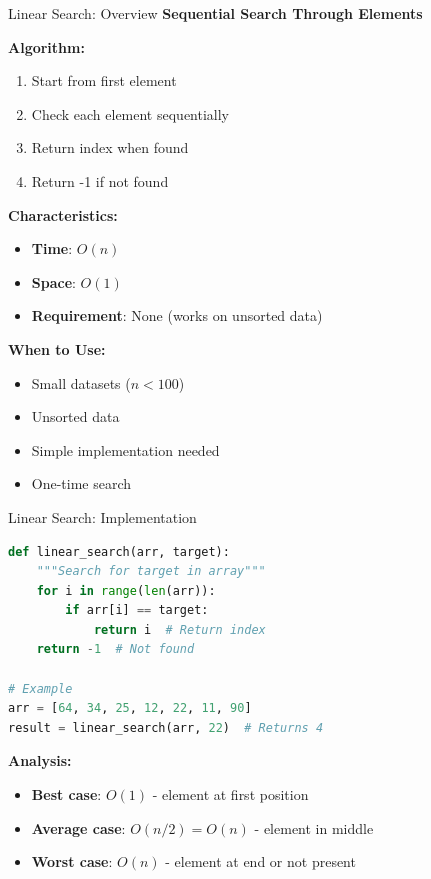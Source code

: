 \documentclass[aspectratio=169]{beamer}
\begin{document}
\begin{frame}{Linear Search: Overview}
  \textbf{Sequential Search Through Elements}

  \vspace{0.3cm}
  \textbf{Algorithm:}
  \begin{enumerate}
    \item Start from first element
    \item Check each element sequentially
    \item Return index when found
    \item Return -1 if not found
  \end{enumerate}

  \vspace{0.3cm}
  \textbf{Characteristics:}
  \begin{itemize}
    \item \textbf{Time}: $O(n)$
    \item \textbf{Space}: $O(1)$
    \item \textbf{Requirement}: None (works on unsorted data)
  \end{itemize}

  \vspace{0.3cm}
  \textbf{When to Use:}
  \begin{itemize}
    \item Small datasets ($n < 100$)
    \item Unsorted data
    \item Simple implementation needed
    \item One-time search
  \end{itemize}
\end{frame}

\begin{frame}[fragile]{Linear Search: Implementation}
\begin{lstlisting}[language=Python, basicstyle=\ttfamily\small]
def linear_search(arr, target):
    """Search for target in array"""
    for i in range(len(arr)):
        if arr[i] == target:
            return i  # Return index
    return -1  # Not found

# Example
arr = [64, 34, 25, 12, 22, 11, 90]
result = linear_search(arr, 22)  # Returns 4
\end{lstlisting}

\vspace{0.3cm}
\textbf{Analysis:}
\begin{itemize}
  \item \textbf{Best case}: $O(1)$ - element at first position
  \item \textbf{Average case}: $O(n/2) = O(n)$ - element in middle
  \item \textbf{Worst case}: $O(n)$ - element at end or not present
\end{itemize}
\end{frame}
\end{document}
